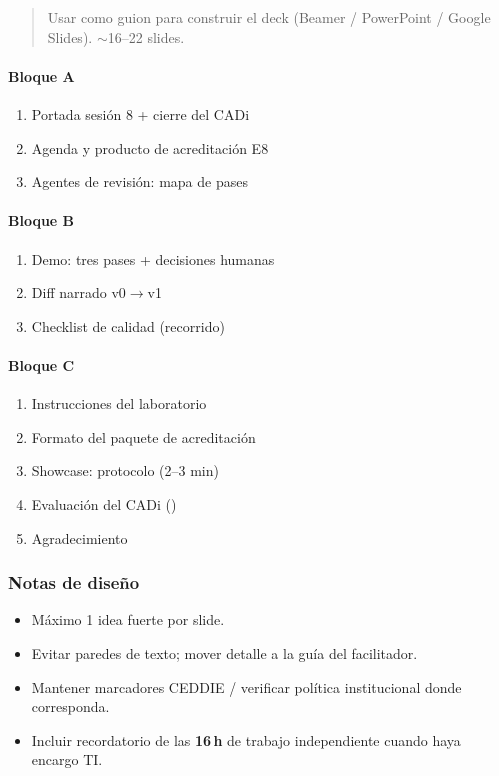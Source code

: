 \begin{quote}
Usar como guion para construir el deck (Beamer / PowerPoint / Google Slides). $\sim$16--22 slides.
\end{quote}

\paragraph{Bloque A}\begin{enumerate}
\item Portada sesión 8 + cierre del CADi
\item Agenda y producto de acreditación E8
\item Agentes de revisión: mapa de pases
\end{enumerate}
\paragraph{Bloque B}\begin{enumerate}
\item Demo: tres pases + decisiones humanas
\item Diff narrado v0$\rightarrow$v1
\item Checklist de calidad (recorrido)
\end{enumerate}
\paragraph{Bloque C}\begin{enumerate}
\item Instrucciones del laboratorio
\item Formato del paquete de acreditación
\item Showcase: protocolo (2--3 min)
\item Evaluación del CADi (\ceddie)
\item Agradecimiento
\end{enumerate}

\subsubsection*{Notas de diseño}
\begin{itemize}
\item Máximo 1 idea fuerte por slide.
\item Evitar paredes de texto; mover detalle a la guía del facilitador.
\item Mantener marcadores CEDDIE / verificar política institucional donde corresponda.
\item Incluir recordatorio de las \textbf{16\,h} de trabajo independiente cuando haya encargo TI.
\end{itemize}
